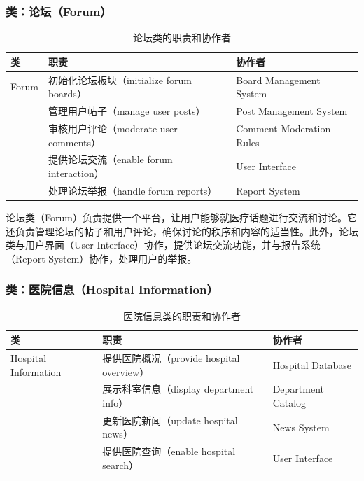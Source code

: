 \subsubsection{类：论坛（Forum）}
\begin{table}[htbp]
	\centering
	\begin{tabular}{|l|l|l|}
		\hline
		\textbf{类} & \textbf{职责} & \textbf{协作者} \\
		\hline
		Forum & 初始化论坛板块（initialize forum boards） & Board Management System \\
		& 管理用户帖子（manage user posts） & Post Management System \\
		& 审核用户评论（moderate user comments） & Comment Moderation Rules \\
		& 提供论坛交流（enable forum interaction） & User Interface \\
		& 处理论坛举报（handle forum reports） & Report System \\
		\hline
	\end{tabular}
	\caption{论坛类的职责和协作者}
	\label{tab:forum}
\end{table}

论坛类（Forum）负责提供一个平台，让用户能够就医疗话题进行交流和讨论。它还负责管理论坛的帖子和用户评论，确保讨论的秩序和内容的适当性。此外，论坛类与用户界面（User Interface）协作，提供论坛交流功能，并与报告系统（Report System）协作，处理用户的举报。

\subsubsection{类：医院信息（Hospital Information）}
\begin{table}[htbp]
	\centering
	\begin{tabular}{|l|l|l|}
		\hline
		\textbf{类} & \textbf{职责} & \textbf{协作者} \\
		\hline
		Hospital Information & 提供医院概况（provide hospital overview） & Hospital Database \\
		& 展示科室信息（display department info） & Department Catalog \\
		& 更新医院新闻（update hospital news） & News System \\
		& 提供医院查询（enable hospital search） & User Interface \\
		\hline
	\end{tabular}
	\caption{医院信息类的职责和协作者}
	\label{tab:hospital_information}
\end{table}

